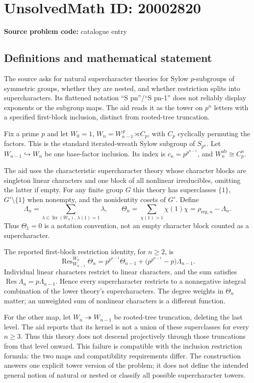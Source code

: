 \documentclass[11pt]{article}
\begin{document}
\section*{UnsolvedMath ID: 20002820}
\textbf{Source problem code:} catalogue entry
\subsection{Definitions and mathematical statement}
The source asks for natural supercharacter theories for Sylow $p$-subgroups of symmetric groups, whether they are nested, and whether restriction splits into supercharacters. Its flattened notation ``S pn''/``S pn-1'' does not reliably display exponents or the subgroup maps. The aid reads it as the tower on $p^n$ letters with a specified first-block inclusion, distinct from rooted-tree truncation.

Fix a prime $p$ and let $W_0=1$, $W_n=W_{n-1}^{\,p}\rtimes C_p$, with $C_p$ cyclically permuting the factors. This is the standard iterated-wreath Sylow subgroup of $S_{p^n}$. Let $W_{n-1}\hookrightarrow W_n$ be one base-factor inclusion. Its index is $c_n=p^{p^{n-1}}$, and $W_n^{\mathrm{ab}}\cong C_p^n$.

The aid uses the characteristic supercharacter theory whose character blocks are singleton linear characters and one block of all nonlinear irreducibles, omitting the latter if empty. For any finite group $G$ this theory has superclasses $\{1\}$, $G'\setminus\{1\}$ when nonempty, and the nonidentity cosets of $G'$. Define
\[
 \Lambda_n=\sum_{\lambda\in\operatorname{Irr}(W_n),\,\lambda(1)=1}\lambda,
 \qquad
 \Theta_n=\sum_{\chi(1)>1}\chi(1)\chi
 =\rho_{\mathrm{reg},n}-\Lambda_n.
\]
Thus $\Theta_1=0$ is a notation convention, not an empty character block counted as a supercharacter.

The reported first-block restriction identity, for $n\ge2$, is
\[
 \operatorname{Res}_{W_{n-1}}^{W_n}\Theta_n
 =p^{p^{n-1}}\Theta_{n-1}
 +\bigl(p^{p^{n-1}}-p\bigr)\Lambda_{n-1}.
\]
Individual linear characters restrict to linear characters, and the sum satisfies $\operatorname{Res}\Lambda_n=p\Lambda_{n-1}$. Hence every supercharacter restricts to a nonnegative integral combination of the lower theory's supercharacters. The degree weights in $\Theta_n$ matter; an unweighted sum of nonlinear characters is a different function.

For the other map, let $W_n\twoheadrightarrow W_{n-1}$ be rooted-tree truncation, deleting the last level. The aid reports that its kernel is not a union of these superclasses for every $n\ge3$. Thus this theory does not descend projectively through those truncations from that level onward. This failure is compatible with the inclusion restriction formula: the two maps and compatibility requirements differ. The construction answers one explicit tower version of the problem; it does not define the intended general notion of natural or nested or classify all possible supercharacter towers.
\end{document}
